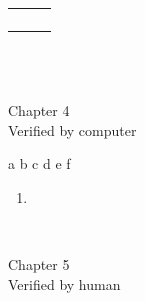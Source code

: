 \documentclass{report}
\begin{document}
\begin{flushleft}
\begin{minipage}{\linewidth}
\begin{minipage}{0.45\textwidth}
\begin{tabular}{|p{\textwidth}}
\begin{enumerate}
\end{enumerate}
\end{tabular}
\end{minipage}\\
\blank[width=\linewidth]{}~\\
\end{minipage}

\begin{minipage}{\linewidth}
\begin{center}
Chapter 4\\
Verified by computer\\
\end{center}

\hspace{25pt} a\hspace{3pt} b\hspace{3pt} c\hspace{3pt} d\hspace{3pt} e\hspace{3pt} f\hspace{3pt} 
\setcounter{enumi}{9}


\begin{enumerate}
  \itemsep0em
	
\setcounter{enumi}{3}
\item \fbox{\mbox{\ooalign{$\square$}} \mbox{\ooalign{$\square$}} \mbox{\ooalign{$\square$}} \mbox{\ooalign{$\square$}} \mbox{\ooalign{$\square$}} \mbox{\ooalign{$\square$}} }
	
		
\end{enumerate}
\blank[width=\linewidth]{}~\\
\end{minipage}

\begin{minipage}{\linewidth}
\begin{center}
Chapter 5\\
Verified by human\\
\end{center}



\end{minipage}
\end{flushleft}
\end{document}

